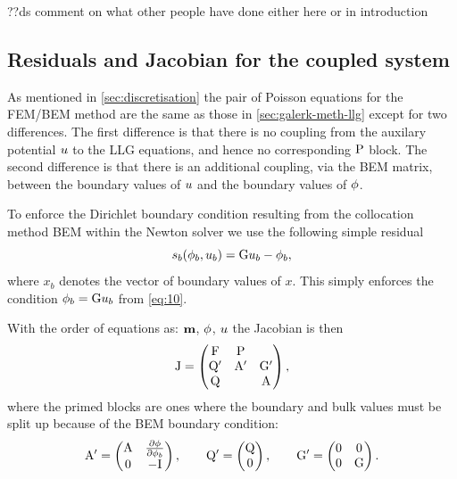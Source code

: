 ??ds comment on what other people have done either here or in introduction


\subsection{Residuals and Jacobian for the coupled system}
\label{sec:bem-jacobian-structure}

As mentioned in \cref{sec:discretisation} the pair of Poisson equations for the FEM/BEM method are the same as those in \cref{sec:galerk-meth-llg} except for two differences.
The first difference is that there is no coupling from the auxilary potential $u$ to the LLG equations, and hence no corresponding $\mathrm{P}$ block.
The second difference is that there is an additional coupling, via the BEM matrix, between the boundary values of $u$ and the boundary values of $\phi$.

To enforce the Dirichlet boundary condition resulting from the collocation method BEM within the Newton solver we use the following simple residual
\newcommand{\rphimb}{\rphi_b}
\begin{equation}
  \rphimb(\phim_b, \phione_b) = \bm \phione_b - \phim_b,
\end{equation}
where $x_b$ denotes the vector of boundary values of $x$.
This simply enforces the condition $\phi_b = {\mathbf{\mathrm{G}}} u_b$ from \cref{eq:10}.

With the order of equations as: $\boldsymbol{\mathrm{m}}$, $\phi$, $u$ the Jacobian is then
\begin{equation}
  \mathrm{J} = 
  \begin{pmatrix}
    \mathrm{F}       & \mathrm{P}     &  \\
    \mathrm{Q}'      & \mathrm{A}' &  {\mathbf{\mathrm{G}}}'  \\
    \mathrm{Q}       &         &   \mathrm{A}
  \end{pmatrix},
  \label{eq:16}
\end{equation}
where the primed blocks are ones where the boundary and bulk values must be split up because of the BEM boundary condition:
\begin{equation}
  \mathrm{A}' =
  \begin{pmatrix}
    \mathrm{A}     & \frac{\partial \phi}{\partial \phi_b} \\
    0      & -\mathrm{I}  
  \end{pmatrix},
  \qquad
  \mathrm{Q}' =
  \begin{pmatrix}
    \mathrm{Q} \\
    0    
  \end{pmatrix}, 
  \qquad
  {\mathbf{\mathrm{G}}}' =
  \begin{pmatrix}
    0  & 0 \\
    0  & {\mathbf{\mathrm{G}}} 
  \end{pmatrix}.
\end{equation}


